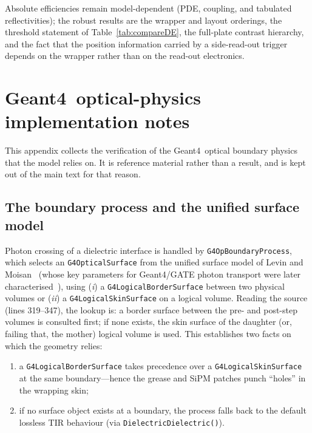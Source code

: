 \documentclass[11pt,a4paper]{article}
\newcommand{\gfour}{Geant4}
\begin{document}
Absolute efficiencies remain model-dependent (PDE, coupling, and tabulated
reflectivities); the robust results are the wrapper and layout orderings, the
threshold statement of Table~\ref{tab:compareDE}, the full-plate contrast
hierarchy, and the fact that the position information carried by a
side-read-out trigger depends on the wrapper rather than on the read-out
electronics.

\appendix
\section{\gfour\ optical-physics implementation notes}
\label{app:g4}

This appendix collects the verification of the \gfour\ optical boundary
physics that the model relies on. It is reference material rather than a
result, and is kept out of the main text for that reason.

\subsection{The boundary process and the unified surface model}

Photon crossing of a dielectric interface is handled by
\texttt{G4OpBoundaryProcess}, which selects an \texttt{G4OpticalSurface} from the
unified surface model of Levin and Moisan~\cite{Levin1996} (whose key
parameters for Geant4/GATE photon transport were later
characterised~\cite{Nilsson2015}), using
(\emph{i}) a \texttt{G4LogicalBorderSurface} between two physical volumes or
(\emph{ii}) a \texttt{G4LogicalSkinSurface} on a logical volume. Reading the
source (lines 319--347), the lookup is: a border surface between the pre- and
post-step volumes is consulted first; if none exists, the skin surface of the
daughter (or, failing that, the mother) logical volume is used. This establishes
two facts on which the geometry relies:
\begin{enumerate}
  \item a \texttt{G4LogicalBorderSurface} takes precedence over a
        \texttt{G4LogicalSkinSurface} at the same boundary---hence the grease
        and SiPM patches punch ``holes'' in the wrapping skin;
  \item if no surface object exists at a boundary, the process falls back to
        the default lossless TIR behaviour (via \texttt{DielectricDielectric()}).
\end{enumerate}
\end{document}
